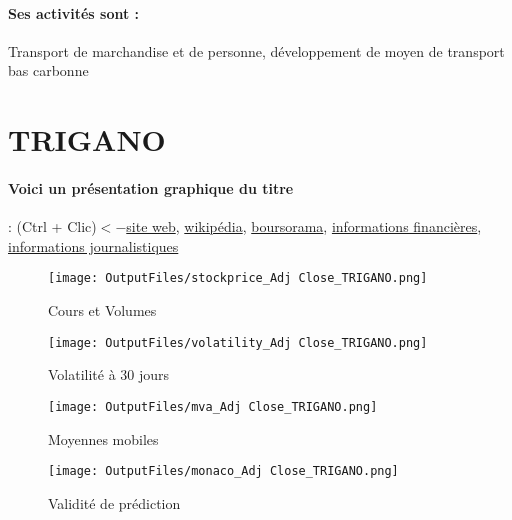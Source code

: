 \documentclass[11pt,a4paper]{report}%
\begin{document}
\paragraph{Ses activités sont : } Transport de marchandise et de personne, développement de moyen de transport bas carbonne 
    
    \newpage

\section{TRIGANO}

\paragraph{Voici un présentation graphique du titre} : (Ctrl + Clic)$<-$\href{http://www.trigano.fr/fr}{site web}, \href{https://fr.wikipedia.org/wiki/Trigano_(entreprise)}{wikipédia}, \href{https://www.boursorama.com/cours/1rPTRI}{boursorama}, \href{https://www.qwant.com/?q=site:https:%2f%2fwww.easybourse.com%2faction-societe%2fTRIGANO&t=web&client=ext-firefox-hp}{informations financières}, \href{https://bourse.lerevenu.com/cours-de-bourse/fiche-valeur-synthese/TRIGANO/TRI-FR}{informations journalistiques}
\begin{figure}[!htb]
   \begin{minipage}{0.5\textwidth}
     \centering
     \texttt{[image: OutputFiles/stockprice\_Adj Close\_TRIGANO.png]}
     \caption{Cours et Volumes}\label{Fig:price_TRIGANO}
   \end{minipage}\hfill
   \begin{minipage}{0.5\textwidth}
     \centering
     \texttt{[image: OutputFiles/volatility\_Adj Close\_TRIGANO.png]}
     \caption{Volatilité à 30 jours}\label{Fig:volat_TRIGANO}
   \end{minipage}
\end{figure}
\begin{figure}[!htb]
   \begin{minipage}{0.5\textwidth}
     \centering
     \texttt{[image: OutputFiles/mva\_Adj Close\_TRIGANO.png]}
     \caption{Moyennes mobiles}\label{Fig:mva_TRIGANO}
   \end{minipage}\hfill
   \begin{minipage}{0.5\textwidth}
     \centering
     \texttt{[image: OutputFiles/monaco\_Adj Close\_TRIGANO.png]}
     \caption{Validité de prédiction}\label{Fig:prediction_TRIGANO}
   \end{minipage}
\end{figure}
\end{document}
